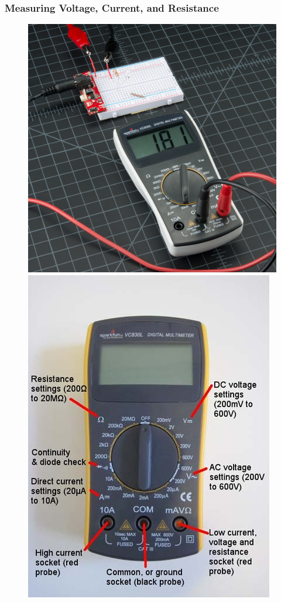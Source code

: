 \documentclass{beamer}
\begin{document}
\begin{frame}
\frametitle{Measuring Voltage, Current, and Resistance}
\begin{figure}
\includegraphics[scale=0.65]{fig/multi1.jpg} 
\includegraphics[scale=0.38]{fig/multi2.jpg} 
\end{figure}
\end{frame}
\end{document}
